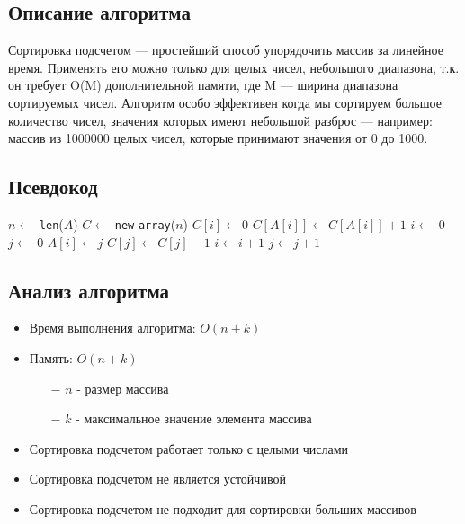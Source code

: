 \subsection{Описание алгоритма}

Сортировка подсчетом — простейший способ упорядочить массив за линейное время.
Применять его можно только для целых чисел, небольшого диапазона,
т.к. он требует O(M) дополнительной памяти,
где M — ширина диапазона сортируемых чисел.
Алгоритм особо эффективен когда мы сортируем большое количество чисел,
значения которых имеют небольшой разброс — например: массив из 1000000 целых чисел,
которые принимают значения от 0 до 1000.

\subsection{Псевдокод}

\begin{algorithmic}
\State $n \gets$ \texttt{len}($A$)
\State $C \gets$ \texttt{new} \texttt{array}($n$)
\State $C[i] \gets 0$
\EndFor
{}
\State $C[A[i]] \gets C[A[i]] + 1$
\EndFor
\State $i \gets$ 0
\State $j \gets$ 0
\State $A[i] \gets j$
\State $C[j] \gets C[j] - 1$
\State $i \gets i + 1$
\Else
\State $j \gets j + 1$
\EndIf
\EndWhile
\EndProcedure
\end{algorithmic}

\subsection{Анализ алгоритма}

\begin{itemize}
    \item Время выполнения алгоритма: $O(n + k)$
    \item Память: $O(n + k)$
    \begin{itemize}
        \item[$-$] $n$ - размер массива
        \item[$-$] $k$ - максимальное значение элемента массива
    \end{itemize}
    \item Сортировка подсчетом работает только с целыми числами
    \item Сортировка подсчетом не является устойчивой
    \item Сортировка подсчетом не подходит для сортировки больших массивов
\end{itemize}

